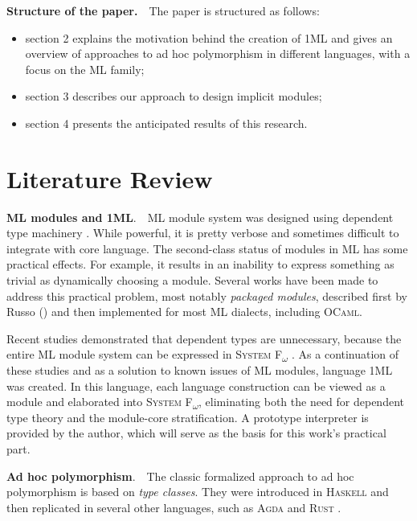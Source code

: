 \documentclass{spbau-diploma}
\begin{document}
\textbf{Structure of the paper.}~~The paper is structured as follows:
\begin{itemize}
\item section 2 explains the motivation behind the creation of \textsc{1ML} and gives an overview of approaches to ad hoc polymorphism in different languages, with a focus on the ML family;
\item section 3 describes our approach to design implicit modules;
\item section 4 presents the anticipated results of this research.
\end{itemize}

\section{Literature Review}

\textbf{\textsc{ML} modules and \textsc{1ML}}.~~\textsc{ML} module system was designed using dependent type machinery \citep{dependent_types}. While powerful, it is pretty verbose and sometimes difficult to integrate with core language. The second-class status of modules in \textsc{ML} has some practical effects. For example, it results in an inability to express something as trivial as dynamically choosing a module. Several works have been made to address this practical problem, most notably \textit{packaged modules}, described first by Russo (\citeyear{packaged}) and then implemented for most \textsc{ML} dialects, including \textsc{OCaml}.

Recent studies demonstrated that dependent types are unnecessary, because the entire \textsc{ML} module system can be expressed in \textsc{System F\textsubscript{$\omega$}} \citep{fing}. As a continuation of these studies and as a solution to known issues of \textsc{ML} modules, language \textsc{1ML} \citep{1ml} was created. In this language, each language construction can be viewed as a module and elaborated into \textsc{System F\textsubscript{$\omega$}}, eliminating both the need for dependent type theory and the module-core stratification. A prototype interpreter is provided by the author, which will serve as the basis for this work's practical part.

\textbf{Ad hoc polymorphism}.~~The classic formalized approach to ad hoc polymorphism is based on \textit{type classes}. They were introduced in \textsc{Haskell} \citep{adhoc} and then replicated in several other languages, such as \textsc{Agda} \citep{agda} and \textsc{Rust} \citep{rust}. 
\end{document}
